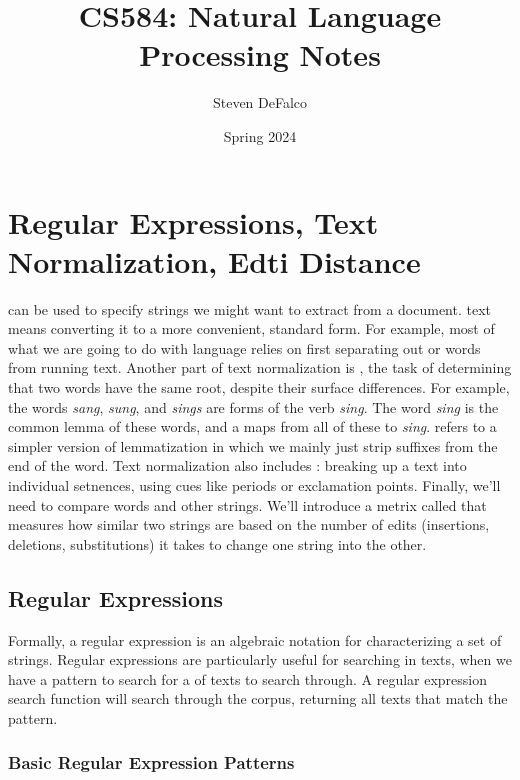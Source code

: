 \documentclass{article}
\title{CS584: Natural Language Processing Notes}
\author{Steven DeFalco}
\date{Spring 2024}
\begin{document}
\maketitle
\tableofcontents
\newpage


\section{Regular Expressions, Text Normalization, Edti Distance}

 can be used to specify strings we might want to extract from a document.  text means converting it to a more convenient, standard form. For example, most of what we are going to do with language relies on first separating out or  words from running text. Another part of text normalization is , the task of determining that two words have the same root, despite their surface differences. For example, the words \emph{sang}, \emph{sung}, and \emph{sings} are forms of the verb \emph{sing}. The word \emph{sing} is the common lemma of these words, and a  maps from all of these to \emph{sing}.  refers to a simpler version of lemmatization in which we mainly just strip suffixes from the end of the word. Text normalization also includes : breaking up a text into individual setnences, using cues like periods or exclamation points. Finally, we'll need to compare words and other strings. We'll introduce a metrix called  that measures how similar two strings are based on the number of edits (insertions, deletions, substitutions) it takes to change one string into the other. 

\subsection{Regular Expressions}

Formally, a regular expression is an algebraic notation for characterizing a set of strings. Regular expressions are particularly useful for searching in texts, when we have a pattern to search for a  of texts to search through. A regular expression search function will search through the corpus, returning all texts that match the pattern. 

\subsubsection{Basic Regular Expression Patterns}
\end{document}
